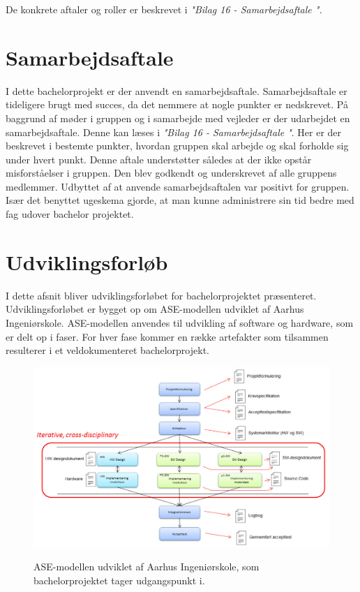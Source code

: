 De konkrete aftaler og roller er beskrevet i \textit{"Bilag 16 - Samarbejdsaftale ".}

\chapter{Samarbejdsaftale}
I dette bachelorprojekt er der anvendt en samarbejdsaftale. Samarbejdsaftale er tideligere brugt med succes, da det nemmere at nogle punkter er nedskrevet. På baggrund af møder i gruppen og i samarbejde med vejleder er der udarbejdet en samarbejdsaftale. Denne kan læses i \textit{"Bilag 16 - Samarbejdsaftale "}. Her er der beskrevet i bestemte punkter, hvordan gruppen skal arbejde og skal forholde sig under hvert punkt. Denne aftale understøtter således at der ikke opstår misforståelser i gruppen. Den blev godkendt og underskrevet af alle gruppens medlemmer. Udbyttet af at anvende samarbejdsaftalen var positivt for gruppen. Især det benyttet ugeskema gjorde, at man kunne administrere sin tid bedre med fag udover bachelor projektet. 


\chapter{Udviklingsforløb}

I dette afsnit bliver udviklingsforløbet for bachelorprojektet præsenteret. Udviklingsforløbet er bygget op om ASE-modellen\cite{IngeniorhojskolenAarhusUniversiteta} udviklet af Aarhus Ingeniørskole. ASE-modellen anvendes til udvikling af software og hardware, som er delt op i faser. For hver fase kommer en række artefakter som tilsammen resulterer i et veldokumenteret bachelorprojekt. 

\begin{figure}[H] 
\centering
{\includegraphics[width=\linewidth]
{Figure/asemodel}}
\caption{ASE-modellen udviklet af Aarhus Ingeniørskole, som bachelorprojektet tager udgangspunkt i.}
\label{asemodel}
\end{figure}



